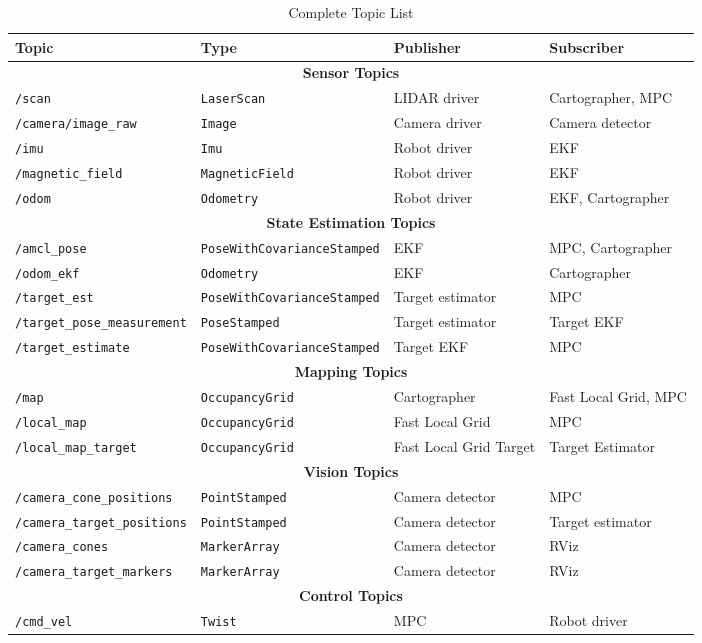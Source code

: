 \documentclass[11pt]{article}
\begin{document}
\begin{table}[H]
\centering
\caption{Complete Topic List}
\begin{tabular}{|l|l|l|l|}
\hline
\textbf{Topic} & \textbf{Type} & \textbf{Publisher} & \textbf{Subscriber} \\
\hline
\hline
\multicolumn{4}{|c|}{\textbf{Sensor Topics}} \\
\hline
\texttt{/scan} & \texttt{LaserScan} & LIDAR driver & Cartographer, MPC \\
\texttt{/camera/image\_raw} & \texttt{Image} & Camera driver & Camera detector \\
\texttt{/imu} & \texttt{Imu} & Robot driver & EKF \\
\texttt{/magnetic\_field} & \texttt{MagneticField} & Robot driver & EKF \\
\texttt{/odom} & \texttt{Odometry} & Robot driver & EKF, Cartographer \\
\hline
\multicolumn{4}{|c|}{\textbf{State Estimation Topics}} \\
\hline
\texttt{/amcl\_pose} & \texttt{PoseWithCovarianceStamped} & EKF & MPC, Cartographer \\
\texttt{/odom\_ekf} & \texttt{Odometry} & EKF & Cartographer \\
\texttt{/target\_est} & \texttt{PoseWithCovarianceStamped} & Target estimator & MPC \\
\texttt{/target\_pose\_measurement} & \texttt{PoseStamped} & Target estimator & Target EKF \\
\texttt{/target\_estimate} & \texttt{PoseWithCovarianceStamped} & Target EKF & MPC \\
\hline
\multicolumn{4}{|c|}{\textbf{Mapping Topics}} \\
\hline
\texttt{/map} & \texttt{OccupancyGrid} & Cartographer & Fast Local Grid, MPC \\
\texttt{/local\_map} & \texttt{OccupancyGrid} & Fast Local Grid & MPC \\
\texttt{/local\_map\_target} & \texttt{OccupancyGrid} & Fast Local Grid Target & Target Estimator \\
\hline
\multicolumn{4}{|c|}{\textbf{Vision Topics}} \\
\hline
\texttt{/camera\_cone\_positions} & \texttt{PointStamped} & Camera detector & MPC \\
\texttt{/camera\_target\_positions} & \texttt{PointStamped} & Camera detector & Target estimator \\
\texttt{/camera\_cones} & \texttt{MarkerArray} & Camera detector & RViz \\
\texttt{/camera\_target\_markers} & \texttt{MarkerArray} & Camera detector & RViz \\
\hline
\multicolumn{4}{|c|}{\textbf{Control Topics}} \\
\hline
\texttt{/cmd\_vel} & \texttt{Twist} & MPC & Robot driver \\
\hline
\end{tabular}
\end{table}
\end{document}
